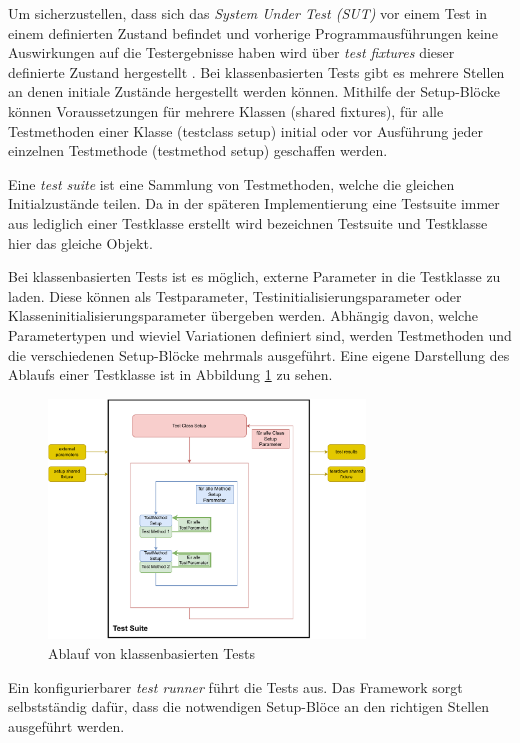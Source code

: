 Um sicherzustellen, dass sich das \textit{System Under Test (SUT)} vor einem Test in einem definierten Zustand befindet und vorherige Programmausführungen keine Auswirkungen auf die Testergebnisse haben wird über \textit{test fixtures} dieser definierte Zustand hergestellt \cite{xUnitpatterns}. Bei klassenbasierten Tests gibt es mehrere Stellen an denen initiale Zustände hergestellt werden können. Mithilfe der Setup-Blöcke können Voraussetzungen für mehrere Klassen (shared fixtures), für alle Testmethoden einer Klasse (testclass setup) initial oder vor Ausführung jeder einzelnen Testmethode (testmethod setup) geschaffen werden.

Eine \textit{test suite} ist eine Sammlung von Testmethoden, welche die gleichen Initialzustände teilen. Da in der späteren Implementierung eine Testsuite immer aus lediglich einer Testklasse erstellt wird bezeichnen Testsuite und Testklasse hier das gleiche Objekt. 

Bei klassenbasierten Tests ist es möglich, externe Parameter in die Testklasse zu laden. Diese können als Testparameter, Testinitialisierungsparameter oder Klasseninitialisierungsparameter übergeben werden. Abhängig davon, welche Parametertypen und wieviel Variationen definiert sind, werden Testmethoden und die verschiedenen Setup-Blöcke mehrmals ausgeführt. Eine eigene Darstellung des Ablaufs einer Testklasse ist in Abbildung \ref{fig:Testklassen_Ablauf} zu sehen. 

\begin{figure}
    \centering
    \includegraphics[width=0.75\textwidth]{figures/3_Implementierung/Testklassen_Ablauf.drawio.pdf}
    \caption{Ablauf von klassenbasierten Tests}
    \label{fig:Testklassen_Ablauf}
\end{figure}

Ein konfigurierbarer \textit{test runner} führt die Tests aus. Das Framework sorgt selbstständig dafür, dass die notwendigen Setup-Blöce an den richtigen Stellen ausgeführt werden.

